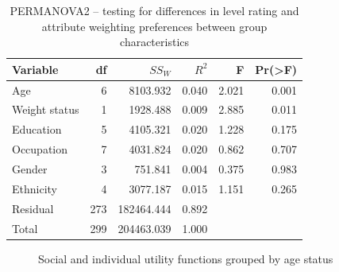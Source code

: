 \documentclass[
  letterpaper,
  DIV=11,
  numbers=noendperiod]{scrartcl}
\begin{document}
\begin{longtable}[]{@{}lrrrrr@{}}

\caption{\label{tbl-permanova2}PERMANOVA2 -- testing for differences in
level rating and attribute weighting preferences between group
characteristics}

\tabularnewline

\toprule\noalign{}
Variable & df & \(SS_W\) & \(R^2\) & F & Pr(\textgreater F) \\
\midrule\noalign{}
\endhead
\bottomrule\noalign{}
\endlastfoot
Age & 6 & 8103.932 & 0.040 & 2.021 & 0.001 \\
Weight status & 1 & 1928.488 & 0.009 & 2.885 & 0.011 \\
Education & 5 & 4105.321 & 0.020 & 1.228 & 0.175 \\
Occupation & 7 & 4031.824 & 0.020 & 0.862 & 0.707 \\
Gender & 3 & 751.841 & 0.004 & 0.375 & 0.983 \\
Ethnicity & 4 & 3077.187 & 0.015 & 1.151 & 0.265 \\
Residual & 273 & 182464.444 & 0.892 & & \\
Total & 299 & 204463.039 & 1.000 & & \\

\end{longtable}

\begin{figure}


\caption{\label{fig-age}Social and individual utility functions grouped
by age status}

\end{figure}%
\end{document}
